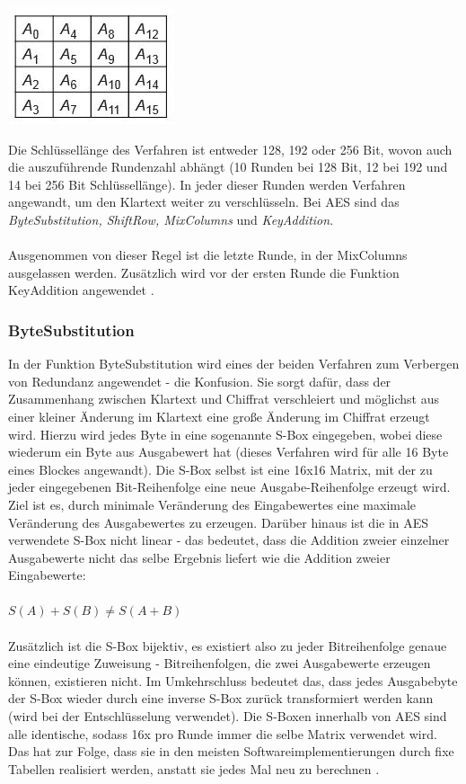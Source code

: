 \documentclass[10pt, a4paper,headsepline,pointednumbers]{scrreprt}
\begin{document}
\includegraphics[scale=0.5]{aes_state.JPG} 
\hfill

Die Schlüssellänge des Verfahren ist entweder 128, 192 oder 256 Bit, wovon auch die auszuführende Rundenzahl abhängt (10 Runden bei 128 Bit, 12 bei 192 und 14 bei 256 Bit Schlüssellänge). In jeder dieser Runden werden Verfahren angewandt, um den Klartext weiter zu verschlüsseln. Bei AES sind das \textit{ByteSubstitution, ShiftRow, MixColumns} und \textit{KeyAddition}. \\ \\
Ausgenommen von dieser Regel ist die letzte Runde, in der MixColumns ausgelassen werden. %
Zusätzlich wird vor der ersten Runde die Funktion KeyAddition angewendet \citep[S. 89ff]{book:understanding-crypto}.

\subsubsection{ByteSubstitution}
In der Funktion ByteSubstitution wird eines der beiden Verfahren zum Verbergen von Redundanz angewendet - die Konfusion. Sie sorgt dafür, dass der Zusammenhang zwischen Klartext und Chiffrat verschleiert und möglichst aus einer kleiner Änderung im Klartext eine große Änderung im Chiffrat erzeugt wird. Hierzu wird jedes Byte in eine sogenannte S-Box eingegeben, wobei diese  wiederum ein Byte aus Ausgabewert hat (dieses Verfahren wird für alle 16 Byte eines Blockes angewandt). Die S-Box selbst ist eine 16x16 Matrix, mit der zu jeder eingegebenen Bit-Reihenfolge eine neue Ausgabe-Reihenfolge erzeugt wird. Ziel ist es, durch minimale Veränderung des Eingabewertes eine maximale Veränderung des Ausgabewertes zu erzeugen. Darüber hinaus ist die in AES verwendete S-Box nicht linear - das bedeutet, dass die Addition zweier einzelner Ausgabewerte nicht das selbe Ergebnis liefert wie die Addition zweier Eingabewerte:\\ \\
\(S(A) + S(B) \neq S(A+B)\) \\ \\
Zusätzlich ist die S-Box bijektiv, es existiert also zu jeder Bitreihenfolge genaue eine eindeutige Zuweisung - Bitreihenfolgen, die zwei Ausgabewerte erzeugen können, existieren nicht. Im Umkehrschluss bedeutet das, dass jedes Ausgabebyte der S-Box wieder durch eine inverse S-Box zurück transformiert werden kann (wird bei der Entschlüsselung verwendet). Die S-Boxen innerhalb von AES sind alle identische, sodass 16x pro Runde immer die selbe Matrix verwendet wird. Das hat zur Folge, dass sie in den meisten Softwareimplementierungen durch fixe Tabellen realisiert werden, anstatt sie jedes Mal neu zu berechnen \citep[S. 101ff]{book:understanding-crypto}.
\end{document}
